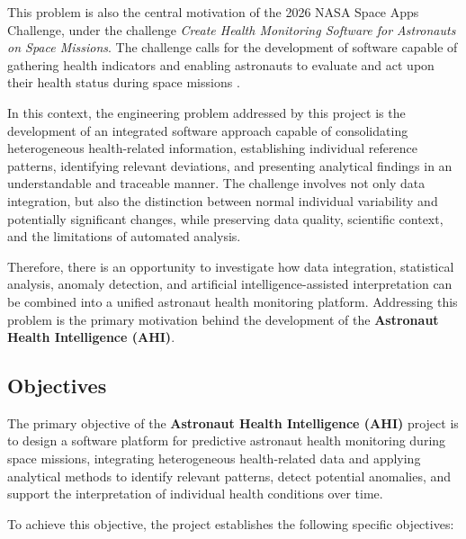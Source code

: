 This problem is also the central motivation of the 2026 NASA Space Apps Challenge, under the challenge \textit{Create Health Monitoring Software for Astronauts on Space Missions}. The challenge calls for the development of software capable of gathering health indicators and enabling astronauts to evaluate and act upon their health status during space missions \cite{nasa_health_monitoring_challenge_2026}.

In this context, the engineering problem addressed by this project is the development of an integrated software approach capable of consolidating heterogeneous health-related information, establishing individual reference patterns, identifying relevant deviations, and presenting analytical findings in an understandable and traceable manner. The challenge involves not only data integration, but also the distinction between normal individual variability and potentially significant changes, while preserving data quality, scientific context, and the limitations of automated analysis.

Therefore, there is an opportunity to investigate how data integration, statistical analysis, anomaly detection, and artificial intelligence-assisted interpretation can be combined into a unified astronaut health monitoring platform. Addressing this problem is the primary motivation behind the development of the \textbf{Astronaut Health Intelligence (AHI)}.

\subsection{Objectives}
\label{subsec:objectives}
The primary objective of the \textbf{Astronaut Health Intelligence (AHI)} project is to design a software platform for predictive astronaut health monitoring during space missions, integrating heterogeneous health-related data and applying analytical methods to identify relevant patterns, detect potential anomalies, and support the interpretation of individual health conditions over time.

To achieve this objective, the project establishes the following specific objectives:

